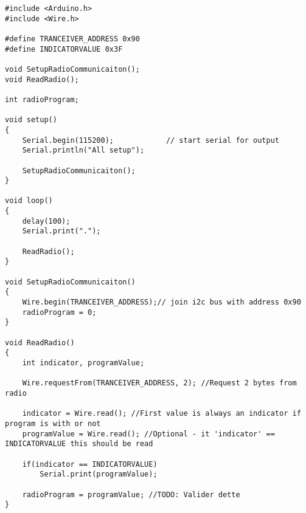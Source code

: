 \documentclass[Main]{subfiles}
\begin{document}
\begin{lstlisting}[caption=title, style=Code-C, label=lst:itocLEs]
#include <Arduino.h>
#include <Wire.h>

#define TRANCEIVER_ADDRESS 0x90
#define INDICATORVALUE 0x3F

void SetupRadioCommunicaiton();
void ReadRadio();

int radioProgram;

void setup()
{
	Serial.begin(115200);            // start serial for output
	Serial.println("All setup");

	SetupRadioCommunicaiton();
}

void loop()
{
	delay(100);
	Serial.print(".");
	
	ReadRadio();
}

void SetupRadioCommunicaiton()
{
	Wire.begin(TRANCEIVER_ADDRESS);// join i2c bus with address 0x90
	radioProgram = 0;
}

void ReadRadio()
{
	int indicator, programValue;

	Wire.requestFrom(TRANCEIVER_ADDRESS, 2); //Request 2 bytes from radio

	indicator = Wire.read(); //First value is always an indicator if program is with or not
	programValue = Wire.read(); //Optional - it 'indicator' == INDICATORVALUE this should be read

	if(indicator == INDICATORVALUE)
		Serial.print(programValue);

	radioProgram = programValue; //TODO: Valider dette
}
\end{lstlisting}
\end{document}
